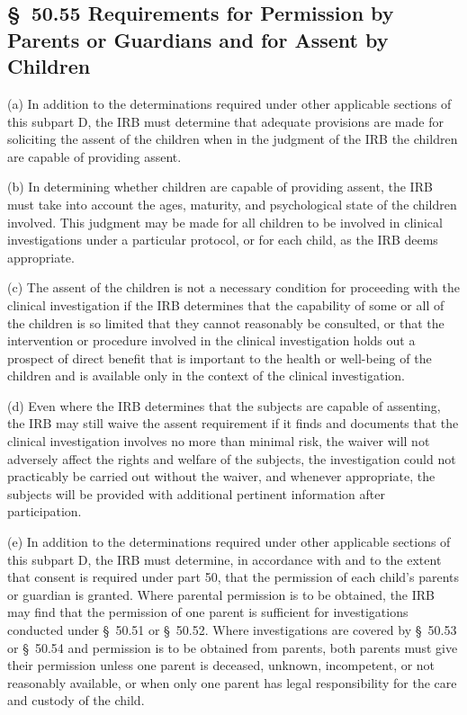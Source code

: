 \subsection{\S~50.55 Requirements for Permission by Parents or Guardians and for Assent by Children}

(a) In addition to the determinations required under other applicable sections of this subpart D, the IRB must determine that adequate provisions are made for soliciting the assent of the children when in the judgment of the IRB the children are capable of providing assent.

(b) In determining whether children are capable of providing assent, the IRB must take into account the ages, maturity, and psychological state of the children involved. This judgment may be made for all children to be involved in clinical investigations under a particular protocol, or for each child, as the IRB deems appropriate.

(c) The assent of the children is not a necessary condition for proceeding with the clinical investigation if the IRB determines that the capability of some or all of the children is so limited that they cannot reasonably be consulted, or that the intervention or procedure involved in the clinical investigation holds out a prospect of direct benefit that is important to the health or well-being of the children and is available only in the context of the clinical investigation.

(d) Even where the IRB determines that the subjects are capable of assenting, the IRB may still waive the assent requirement if it finds and documents that the clinical investigation involves no more than minimal risk, the waiver will not adversely affect the rights and welfare of the subjects, the investigation could not practicably be carried out without the waiver, and whenever appropriate, the subjects will be provided with additional pertinent information after participation.

(e) In addition to the determinations required under other applicable sections of this subpart D, the IRB must determine, in accordance with and to the extent that consent is required under part 50, that the permission of each child's parents or guardian is granted. Where parental permission is to be obtained, the IRB may find that the permission of one parent is sufficient for investigations conducted under \S~50.51 or \S~50.52. Where investigations are covered by \S~50.53 or \S~50.54 and permission is to be obtained from parents, both parents must give their permission unless one parent is deceased, unknown, incompetent, or not reasonably available, or when only one parent has legal responsibility for the care and custody of the child.

